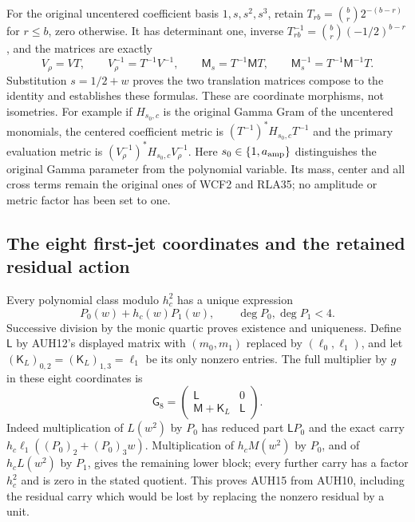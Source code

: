 For the original uncentered coefficient basis $1,s,s^2,s^3$, retain
$T_{rb}=\binom br2^{-(b-r)}$ for $r\le b$, zero otherwise.
It has determinant one, inverse
$T^{-1}_{rb}=\binom br(-1/2)^{b-r}$, and the matrices are exactly
\[
 V_\rho=VT,\qquad
 V_\rho^{-1}=T^{-1}V^{-1},\qquad
 \mathsf M_s=T^{-1}\mathsf M T,\qquad
 \mathsf M_s^{-1}=T^{-1}\mathsf M^{-1}T.
 \tag{AUH14}
\]
Substitution $s=1/2+w$ proves the two translation matrices compose
to the identity and establishes these formulas.
These are coordinate morphisms, not isometries.
For example if $H_{s_0,c}$ is the original Gamma Gram of the
uncentered monomials, the centered coefficient metric is
$(T^{-1})^*H_{s_0,c}T^{-1}$ and the primary evaluation metric is
$(V_\rho^{-1})^*H_{s_0,c}V_\rho^{-1}$.
Here $s_0\in\{1,a_{\rm amp}\}$ distinguishes the original
Gamma parameter from the polynomial variable.  Its mass, center
and all cross terms remain the original ones of WCF2 and RLA35;
no amplitude or metric factor has been set to one.

\subsection{The eight first-jet coordinates and the retained residual action}

Every polynomial class modulo $h_c^2$ has a unique expression
\[
 P_0(w)+h_c(w)P_1(w),\qquad \deg P_0,\deg P_1<4.
\]
Successive division by the monic quartic proves existence and
uniqueness.  Define $\mathsf L$ by AUH12's displayed matrix with
$(m_0,m_1)$ replaced by $(\ell_0,\ell_1)$, and let
$(\mathsf K_L)_{0,2}=(\mathsf K_L)_{1,3}=\ell_1$ be its only
nonzero entries.  The full multiplier by $g$ in these eight
coordinates is
\[
 \mathsf G_8=
 \begin{pmatrix}\mathsf L&0\\\mathsf M+\mathsf K_L&\mathsf L\end{pmatrix}.
 \tag{AUH15}
\]
Indeed multiplication of $L(w^2)$ by $P_0$ has reduced part
$\mathsf L P_0$ and the exact carry
$h_c\ell_1((P_0)_2+(P_0)_3w)$.
Multiplication of $h_cM(w^2)$ by $P_0$, and of $h_cL(w^2)$ by
$P_1$, gives the remaining lower block; every further carry has
a factor $h_c^2$ and is zero in the stated quotient.
This proves AUH15 from AUH10, including the residual carry which
would be lost by replacing the nonzero residual by a unit.

